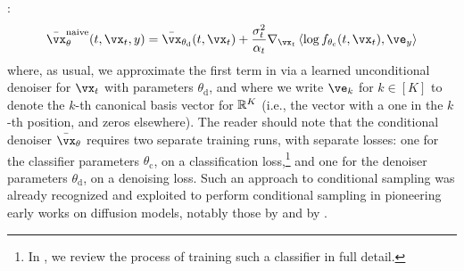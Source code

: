 \documentclass[../../book-main.tex]{subfiles}
\begin{document}
:
\begin{equation}\label{eq:conditional-denoising-mmse-denoiser-paired-data-approx}
  \bar{\vx}_{\theta}^{\mathrm{naive}}(t, \vx_t, y)
  =
  \bar{\vx}_{\theta_{\mathrm{d}}}(t, \vx_t)
  + \frac{\sigma_t^2}{\alpha_t}
  \nabla_{\vx_t}
  \ip*{
    \log f_{\theta_{\mathrm{c}}}(t, \vx_t)
  }{
    \ve_{y}
  }
\end{equation}
where, as usual, we approximate the first term in
 via a learned
unconditional denoiser for $\vx_t$ with parameters $\theta_{\mathrm{d}}$, and
where we write $\ve_k$ for $k \in [K]$ to denote the $k$-th canonical basis
vector for $\mathbb{R}^K$ (i.e., the vector with
a one in the $k$-th position, and zeros elsewhere).
The reader should note that the conditional denoiser $\bar{\vx}_{\theta}$
requires two separate training runs, with separate losses: one for the
classifier parameters $\theta_{\mathrm{c}}$, on a classification
loss,\footnote{In , we review the process of training such
a classifier in full detail.} and one for the denoiser parameters
$\theta_{\mathrm{d}}$, on a denoising loss. Such an approach to conditional
sampling was already recognized and exploited to perform conditional sampling in
pioneering early works on diffusion models, notably those by
\citet{Sohl-Dickstein2015} and by \citet{song2020score}.
\end{document}
